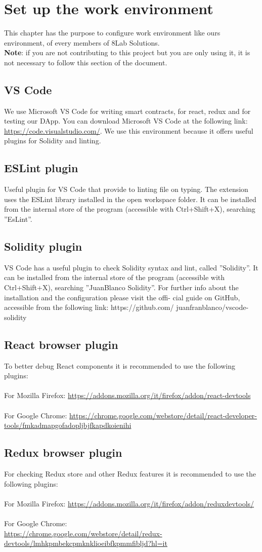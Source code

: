\section{Set up the work environment}
This chapter has the purpose to configure work environment like ours environment, of every members of 8Lab Solutions. \\
\textbf{Note}: if you are not contributing to this project but you are only using it, it
is not necessary to follow this section of the document.
\subsection{VS Code}
We use Microsoft VS Code for writing smart contracts, for react, redux and for testing our DApp. You can download Microsoft VS Code at the following link: \url{https://code.visualstudio.com/}. We use this environment because it offers useful plugins for Solidity and linting.
\subsection{ESLint plugin}
Useful plugin for VS Code that provide to linting file on typing. The extension uses the ESLint library installed in the open workspace folder.
It can be installed from the internal store of the program (accessible with Ctrl+Shift+X),
searching ”EsLint”.
\subsection{Solidity plugin}
VS Code has a useful plugin to check Solidity syntax and lint, called ”Solidity”.
It can be installed from the internal store of the program (accessible with Ctrl+Shift+X),
searching ”JuanBlanco Solidity”.
For further info about the installation and the configuration please visit the offi-
cial guide on GitHub, accessible from the following link:
https://github.com/
juanfranblanco/vscode-solidity
\subsection{React browser plugin}
To better debug React components it is recommended to use the following plugins: \\ \\
For Mozilla Firefox:
\url{https://addons.mozilla.org/it/firefox/addon/react-devtools} \\ \\
For Google Chrome:
\url{https://chrome.google.com/webstore/detail/react-developer-tools/fmkadmapgofadopljbjfkapdkoienihi}
\subsection{Redux browser plugin}
For checking Redux store and other Redux features it is recommended to use the following plugins: \\ \\
For Mozilla Firefox:
\url{https://addons.mozilla.org/it/firefox/addon/reduxdevtools/} \\ \\
For Google Chrome: \\
\url{https://chrome.google.com/webstore/detail/redux-devtools/lmhkpmbekcpmknklioeibfkpmmfibljd?hl=it}
